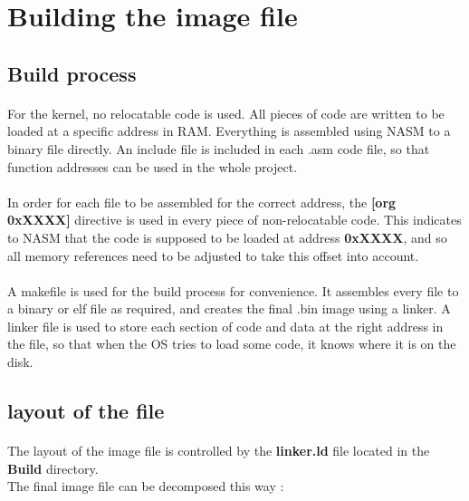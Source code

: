 \documentclass[12pt,letterpaper]{article}
\begin{document}
\newpage
\section{Building the image file}
\subsection{Build process}
\paragraph{}
For the kernel, no relocatable code is used. All pieces of code are written to be loaded at a specific address in RAM. Everything is assembled using NASM to a binary file directly. An include file is included in each .asm code file, so that function addresses can be used in the whole project.

\paragraph{}
In order for each file to be assembled for the correct address, the \textbf{[org 0xXXXX]} directive is used in every piece of non-relocatable code. This indicates to NASM that the code is supposed to be loaded at address \textbf{0xXXXX}, and so all memory references need to be adjusted to take this offset into account.

\paragraph{}
A makefile is used for the build process for convenience. It assembles every file to a binary or elf file as required, and creates the final .bin image using a linker. A linker file is used to store each section of code and data at the right address in the file, so that when the OS tries to load some code, it knows where it is on the disk.

\subsection{layout of the file}
\paragraph{}
The layout of the image file is controlled by the \textbf{linker.ld} file located in the \textbf{Build} directory.\\
The final image file can be decomposed this way :
\end{document}

